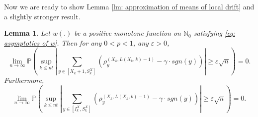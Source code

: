 \documentclass[twoside,12pt, a4paper, final]{article}
\newtheorem{lemma}{Lemma}[section]
\numberwithin{equation}{section}
\theoremstyle{remark}
\newcommand{\abs}[1]{\left\vert #1 \right\vert}
\newcommand\TBD{\textcolor{red}{TBD.}}
\newcommand{\edt}[1]{\textcolor{red}{#1}} %
\begin{document}
	Now we are ready to show Lemma \ref{lm: approximation of means of local drift}
	and a slightly stronger result.
	\begin{lemma}
		Let $w(.)$ be a positive monotone function on $\mathbb{N}_0$ satisfying \eqref{eq: asymptotics of w}. Then for any $0<p<1$, any $\varepsilon>0$,
		$$
		\lim_{n\to\infty} \mathbb{P}\left( \sup_{k\leq n t}  \abs{  	\sum_{y\in \left[X_{k}+1 ,S_{k}^X\right]} \left( \rho^{(X_k,L(X_k,k)-1)}_y -  \gamma \cdot sgn(y) \right) } \geq  \varepsilon \sqrt{n}     \right) =0.
		$$
		Furthermore,
		\[
		\lim_{n\to\infty} \mathbb{P}\left( \sup_{k\leq n t}  \abs{  	\sum_{y\in \left[I_k^{X} ,S_{k}^X\right]} \left( \rho^{(X_k,L(X_k,k)-1)}_y -  \gamma \cdot sgn(y) \right) } \geq  \varepsilon \sqrt{n}     \right) =0.
		\]
	\end{lemma}
\end{document}
